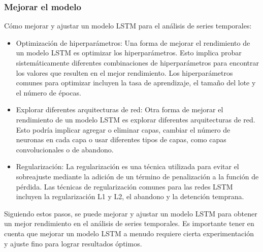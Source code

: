 \documentclass[11pt]{article}
\begin{document}
\subsubsection{Mejorar el modelo}
\label{sec:org2f9c122}
Cómo mejorar y ajustar un modelo LSTM para el análisis de series temporales:

\begin{itemize}
\item Optimización de hiperparámetros: Una forma de mejorar el
rendimiento de un modelo LSTM es optimizar los
hiperparámetros. Esto implica probar sistemáticamente diferentes
combinaciones de hiperparámetros para encontrar los valores que
resulten en el mejor rendimiento. Los hiperparámetros comunes para
optimizar incluyen la tasa de aprendizaje, el tamaño del lote y el
número de épocas.

\item Explorar diferentes arquitecturas de red: Otra forma de mejorar el
rendimiento de un modelo LSTM es explorar diferentes arquitecturas
de red. Esto podría implicar agregar o eliminar capas, cambiar el
número de neuronas en cada capa o usar diferentes tipos de capas,
como capas convolucionales o de abandono.

\item Regularización: La regularización es una técnica utilizada para
evitar el sobreajuste mediante la adición de un término de
penalización a la función de pérdida. Las técnicas de
regularización comunes para las redes LSTM incluyen la
regularización L1 y L2, el abandono y la detención temprana.
\end{itemize}

Siguiendo estos pasos, se puede mejorar y ajustar un modelo LSTM para
obtener un mejor rendimiento en el análisis de series temporales. Es
importante tener en cuenta que mejorar un modelo LSTM a menudo
requiere cierta experimentación y ajuste fino para lograr resultados
óptimos.
\end{document}

